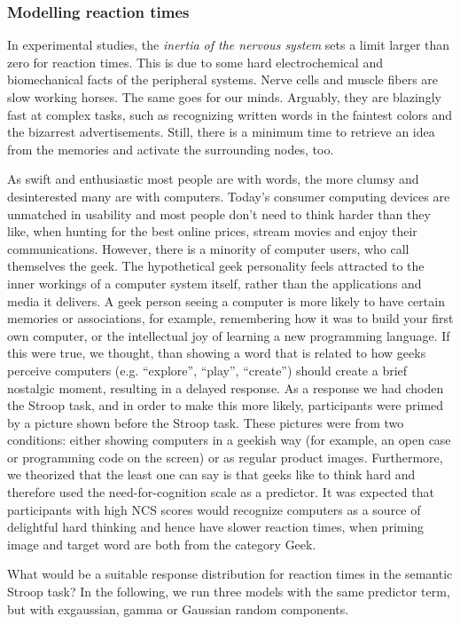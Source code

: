 \documentclass[]{svmono}
\theoremstyle{definition}
\theoremstyle{definition}
\theoremstyle{definition}
\theoremstyle{remark}
\begin{document}
\subsubsection{Modelling reaction times}\label{modelling-reaction-times}

In experimental studies, the \emph{inertia of the nervous system} sets a
limit larger than zero for reaction times. This is due to some hard
electrochemical and biomechanical facts of the peripheral systems. Nerve
cells and muscle fibers are slow working horses. The same goes for our
minds. Arguably, they are blazingly fast at complex tasks, such as
recognizing written words in the faintest colors and the bizarrest
advertisements. Still, there is a minimum time to retrieve an idea from
the memories and activate the surrounding nodes, too.

As swift and enthusiastic most people are with words, the more clumsy
and desinterested many are with computers. Today's consumer computing
devices are unmatched in usability and most people don't need to think
harder than they like, when hunting for the best online prices, stream
movies and enjoy their communications. However, there is a minority of
computer users, who call themselves the geek. The hypothetical geek
personality feels attracted to the inner workings of a computer system
itself, rather than the applications and media it delivers. A geek
person seeing a computer is more likely to have certain memories or
associations, for example, remembering how it was to build your first
own computer, or the intellectual joy of learning a new programming
language. If this were true, we thought, than showing a word that is
related to how geeks perceive computers (e.g. ``explore'', ``play'',
``create'') should create a brief nostalgic moment, resulting in a
delayed response. As a response we had choden the Stroop task, and in
order to make this more likely, participants were primed by a picture
shown before the Stroop task. These pictures were from two conditions:
either showing computers in a geekish way (for example, an open case or
programming code on the screen) or as regular product images.
Furthermore, we theorized that the least one can say is that geeks like
to think hard and therefore used the need-for-cognition scale as a
predictor. It was expected that participants with high NCS scores would
recognize computers as a source of delightful hard thinking and hence
have slower reaction times, when priming image and target word are both
from the category Geek.

What would be a suitable response distribution for reaction times in the
semantic Stroop task? In the following, we run three models with the
same predictor term, but with exgaussian, gamma or Gaussian random
components.
\end{document}
